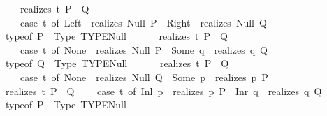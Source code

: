 \begin{isabellebody}
\ \ \ \ \ {\isacharparenleft}{\kern0pt}realizes\ t\ {\isacharparenleft}{\kern0pt}P\ {\isasymor}\ Q{\isacharparenright}{\kern0pt}{\isacharparenright}{\kern0pt}\ {\isasymequiv}\isanewline
\ \ \ \ \ {\isacharparenleft}{\kern0pt}case\ t\ of\ Left\ {\isasymRightarrow}\ realizes\ Null\ P\ {\isacharbar}{\kern0pt}\ Right\ {\isasymRightarrow}\ realizes\ Null\ Q{\isacharparenright}{\kern0pt}{\isachardoublequoteclose}\isanewline
\isanewline
\ \ {\isachardoublequoteopen}{\isacharparenleft}{\kern0pt}typeof\ P{\isacharparenright}{\kern0pt}\ {\isasymequiv}\ {\isacharparenleft}{\kern0pt}Type\ {\isacharparenleft}{\kern0pt}TYPE{\isacharparenleft}{\kern0pt}Null{\isacharparenright}{\kern0pt}{\isacharparenright}{\kern0pt}{\isacharparenright}{\kern0pt}\ {\isasymLongrightarrow}\isanewline
\ \ \ \ \ {\isacharparenleft}{\kern0pt}realizes\ t\ {\isacharparenleft}{\kern0pt}P\ {\isasymor}\ Q{\isacharparenright}{\kern0pt}{\isacharparenright}{\kern0pt}\ {\isasymequiv}\isanewline
\ \ \ \ \ {\isacharparenleft}{\kern0pt}case\ t\ of\ None\ {\isasymRightarrow}\ realizes\ Null\ P\ {\isacharbar}{\kern0pt}\ Some\ q\ {\isasymRightarrow}\ realizes\ q\ Q{\isacharparenright}{\kern0pt}{\isachardoublequoteclose}\isanewline
\isanewline
\ \ {\isachardoublequoteopen}{\isacharparenleft}{\kern0pt}typeof\ Q{\isacharparenright}{\kern0pt}\ {\isasymequiv}\ {\isacharparenleft}{\kern0pt}Type\ {\isacharparenleft}{\kern0pt}TYPE{\isacharparenleft}{\kern0pt}Null{\isacharparenright}{\kern0pt}{\isacharparenright}{\kern0pt}{\isacharparenright}{\kern0pt}\ {\isasymLongrightarrow}\isanewline
\ \ \ \ \ {\isacharparenleft}{\kern0pt}realizes\ t\ {\isacharparenleft}{\kern0pt}P\ {\isasymor}\ Q{\isacharparenright}{\kern0pt}{\isacharparenright}{\kern0pt}\ {\isasymequiv}\isanewline
\ \ \ \ \ {\isacharparenleft}{\kern0pt}case\ t\ of\ None\ {\isasymRightarrow}\ realizes\ Null\ Q\ {\isacharbar}{\kern0pt}\ Some\ p\ {\isasymRightarrow}\ realizes\ p\ P{\isacharparenright}{\kern0pt}{\isachardoublequoteclose}\isanewline
\isanewline
\ \ {\isachardoublequoteopen}{\isacharparenleft}{\kern0pt}realizes\ t\ {\isacharparenleft}{\kern0pt}P\ {\isasymor}\ Q{\isacharparenright}{\kern0pt}{\isacharparenright}{\kern0pt}\ {\isasymequiv}\isanewline
\ \ \ {\isacharparenleft}{\kern0pt}case\ t\ of\ Inl\ p\ {\isasymRightarrow}\ realizes\ p\ P\ {\isacharbar}{\kern0pt}\ Inr\ q\ {\isasymRightarrow}\ realizes\ q\ Q{\isacharparenright}{\kern0pt}{\isachardoublequoteclose}\isanewline
\isanewline
\ \ {\isachardoublequoteopen}{\isacharparenleft}{\kern0pt}typeof\ P{\isacharparenright}{\kern0pt}\ {\isasymequiv}\ {\isacharparenleft}{\kern0pt}Type\ {\isacharparenleft}{\kern0pt}TYPE{\isacharparenleft}{\kern0pt}Null{\isacharparenright}{\kern0pt}{\isacharparenright}{\kern0pt}{\isacharparenright}{\kern0pt}\ {\isasymLongrightarrow}\isanewline

\end{isabellebody}
